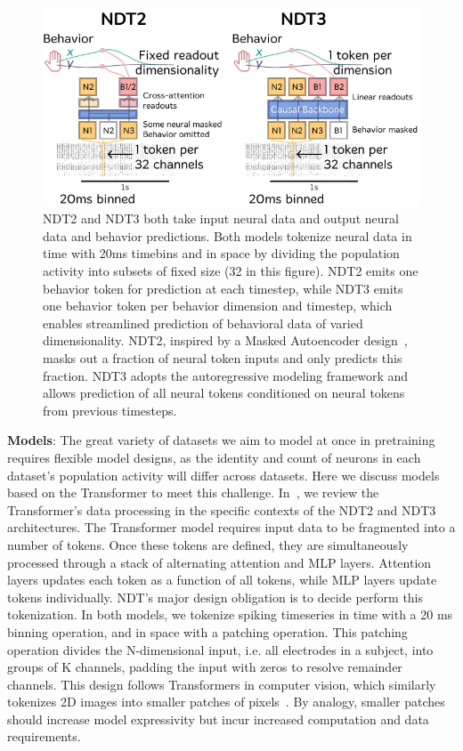 \documentclass[12pt,oneside]{report}
\begin{document}
\begin{figure}[h]
  \centering
  \includegraphics[width=0.8\linewidth]{ch2_ndt_models.png}
  \caption{NDT2 and NDT3 both take input neural data and output neural data and behavior predictions. Both models tokenize neural data in time with 20ms timebins and in space by dividing the population activity into subsets of fixed size (32 in this figure). NDT2 emits one behavior token for prediction at each timestep, while NDT3 emits one behavior token per behavior dimension and timestep, which enables streamlined prediction of behavioral data of varied dimensionality. NDT2, inspired by a Masked Autoencoder design~\citep{he_21_mae}, masks out a fraction of neural token inputs and only predicts this fraction. NDT3 adopts the autoregressive modeling framework and allows prediction of all neural tokens conditioned on neural tokens from previous timesteps. }
  \label{fig:ndt_models}
\end{figure}

\textbf{Models}: The great variety of datasets we aim to model at once in pretraining requires flexible model designs, as the identity and count of neurons in each dataset’s population activity will differ across datasets. Here we discuss models based on the Transformer to meet this challenge. In~, we review the Transformer’s data processing in the specific contexts of the NDT2 and NDT3 architectures. The Transformer model requires input data to be fragmented into a number of tokens. Once these tokens are defined, they are simultaneously processed through a stack of alternating attention and MLP layers. Attention layers updates each token as a function of all tokens, while MLP layers update tokens individually. NDT’s major design obligation is to decide perform this tokenization. In both models, we tokenize spiking timeseries in time with a 20 ms binning operation, and in space with a patching operation. This patching operation divides the N-dimensional input, i.e. all electrodes in a subject, into groups of K channels, padding the input with zeros to resolve remainder channels. This design follows Transformers in computer vision, which similarly tokenizes 2D images into smaller patches of pixels~\citep{he_21_mae,dosovitskiy_2021_vit}. By analogy, smaller patches should increase model expressivity but incur increased computation and data requirements.
\end{document}
